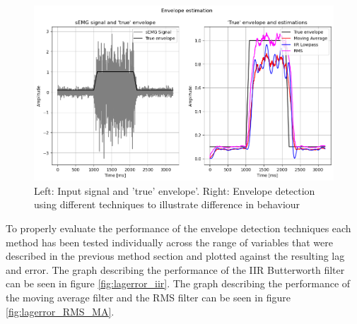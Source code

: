\begin{figure}[h!t]
	\begin{center}
		\includegraphics[width=1.0\columnwidth]{images/envelope_detection.png}
	\end{center}
	\caption{Left: Input signal and 'true' envelope'. Right: Envelope detection using different techniques to illustrate difference in behaviour}
	\label{fig:envelope_detection}
\end{figure}

To properly evaluate the performance of the envelope detection techniques each method has been tested individually across the range of variables that were described in the previous method section and plotted against the resulting lag and error. The graph describing the performance of the IIR Butterworth filter can be seen in figure \ref{fig:lagerror_iir}. The graph describing the performance of the moving average filter and the RMS filter can be seen in figure \ref{fig:lagerror_RMS_MA}.

